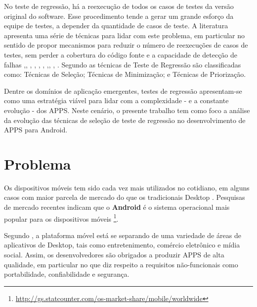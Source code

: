 No teste de regressão, há a reexecução de todos os casos de testes da versão original do software. Esse procedimento tende a gerar um grande esforço da equipe de testes, a depender da quantidade de casos de teste. A literatura apresenta uma série de técnicas para lidar com este problema, em particular no sentido de propor mecanismos para reduzir o número de reexecuções de casos de testes, sem perder a cobertura do código fonte e a capacidade de detecção de falhas ,\cite{65194}, \cite{WHITE1991}, \cite{Graves:2001:ESR:367008.367020}, \cite{630875}, \cite{536955}, \cite{ENGSTROM201014},\cite{ENGSTROM201014}, \cite{KAZMI2017}, \cite{ROMANO201862}. Segundo  as técnicas de Teste de Regressão são classificadas como: Técnicas de Seleção; Técnicas de Minimização; e Técnicas de Priorização.  

Dentre os domínios de aplicação emergentes, testes de regressão apresentam-se como uma estratégia viável para lidar com a complexidade - e a constante evolução - dos \ac{APPS}. Neste cenário, o presente trabalho tem como foco a análise da evolução das técnicas de seleção de teste de regressão no desenvolvimento de \ac{APPS} para Android.


\section{Problema}\label{sec:problema}

Os dispositivos móveis tem sido cada vez mais utilizados no cotidiano, em alguns casos com maior parcela de mercado do que os tradicionais Desktop \cite{Do2016RedroidAR}. Pesquisas de mercado recentes indicam que o \textbf{Android} é o sistema operacional mais popular para os dispositivos móveis \footnote{\url{http://gs.statcounter.com/os-market-share/mobile/worldwide}}. 

Segundo , a plataforma móvel está se separando de uma variedade de áreas de aplicativos de Desktop, tais como entretenimento, comércio eletrônico e mídia social. Assim, os desenvolvedores são obrigados a produzir \ac{APPS} de alta qualidade, em particular no que diz respeito a requisitos não-funcionais como portabilidade, confiabilidade e segurança.




